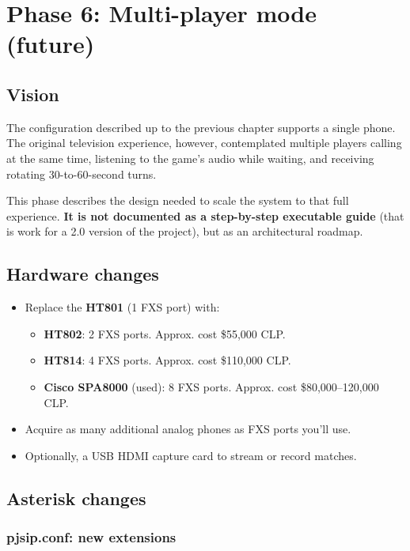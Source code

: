 \chapter{Phase 6: Multi-player mode (future)}

\section{Vision}

The configuration described up to the previous chapter supports a single phone. The original television experience, however, contemplated multiple players calling at the same time, listening to the game's audio while waiting, and receiving rotating 30-to-60-second turns.

This phase describes the design needed to scale the system to that full experience. \textbf{It is not documented as a step-by-step executable guide} (that is work for a 2.0 version of the project), but as an architectural roadmap.

\section{Hardware changes}

\begin{itemize}
  \item Replace the \textbf{HT801} (1 FXS port) with:
    \begin{itemize}
      \item \textbf{HT802}: 2 FXS ports. Approx. cost \$55,000 CLP.
      \item \textbf{HT814}: 4 FXS ports. Approx. cost \$110,000 CLP.
      \item \textbf{Cisco SPA8000} (used): 8 FXS ports. Approx. cost \$80,000--120,000 CLP.
    \end{itemize}
  \item Acquire as many additional analog phones as FXS ports you'll use.
  \item Optionally, a USB HDMI capture card to stream or record matches.
\end{itemize}

\section{Asterisk changes}

\subsection{pjsip.conf: new extensions}

